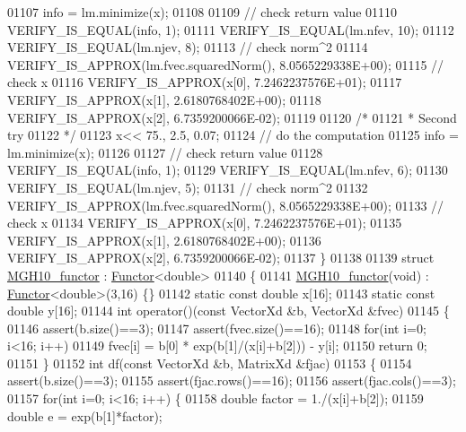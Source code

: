 \begin{DoxyCode}
01107   info = lm.minimize(x);
01108 
01109   \textcolor{comment}{// check return value}
01110   VERIFY\_IS\_EQUAL(info, 1);
01111   VERIFY\_IS\_EQUAL(lm.nfev, 10);
01112   VERIFY\_IS\_EQUAL(lm.njev, 8);
01113   \textcolor{comment}{// check norm^2}
01114   VERIFY\_IS\_APPROX(lm.fvec.squaredNorm(), 8.0565229338E+00);
01115   \textcolor{comment}{// check x}
01116   VERIFY\_IS\_APPROX(x[0], 7.2462237576E+01);
01117   VERIFY\_IS\_APPROX(x[1], 2.6180768402E+00);
01118   VERIFY\_IS\_APPROX(x[2], 6.7359200066E-02);
01119 
01120   \textcolor{comment}{/*}
01121 \textcolor{comment}{   * Second try}
01122 \textcolor{comment}{   */}
01123   x<< 75., 2.5, 0.07;
01124   \textcolor{comment}{// do the computation}
01125   info = lm.minimize(x);
01126 
01127   \textcolor{comment}{// check return value}
01128   VERIFY\_IS\_EQUAL(info, 1);
01129   VERIFY\_IS\_EQUAL(lm.nfev, 6);
01130   VERIFY\_IS\_EQUAL(lm.njev, 5);
01131   \textcolor{comment}{// check norm^2}
01132   VERIFY\_IS\_APPROX(lm.fvec.squaredNorm(), 8.0565229338E+00);
01133   \textcolor{comment}{// check x}
01134   VERIFY\_IS\_APPROX(x[0], 7.2462237576E+01);
01135   VERIFY\_IS\_APPROX(x[1], 2.6180768402E+00);
01136   VERIFY\_IS\_APPROX(x[2], 6.7359200066E-02);
01137 \}
01138 
01139 \textcolor{keyword}{struct }\hyperlink{struct_m_g_h10__functor}{MGH10\_functor} : \hyperlink{struct_functor}{Functor}<double>
01140 \{
01141     \hyperlink{struct_m_g_h10__functor}{MGH10\_functor}(\textcolor{keywordtype}{void}) : \hyperlink{struct_functor}{Functor}<double>(3,16) \{\}
01142     \textcolor{keyword}{static} \textcolor{keyword}{const} \textcolor{keywordtype}{double} x[16];
01143     \textcolor{keyword}{static} \textcolor{keyword}{const} \textcolor{keywordtype}{double} y[16];
01144     \textcolor{keywordtype}{int} operator()(\textcolor{keyword}{const} VectorXd &b, VectorXd &fvec)
01145     \{
01146         assert(b.size()==3);
01147         assert(fvec.size()==16);
01148         \textcolor{keywordflow}{for}(\textcolor{keywordtype}{int} i=0; i<16; i++)
01149             fvec[i] =  b[0] * exp(b[1]/(x[i]+b[2])) - y[i];
01150         \textcolor{keywordflow}{return} 0;
01151     \}
01152     \textcolor{keywordtype}{int} df(\textcolor{keyword}{const} VectorXd &b, MatrixXd &fjac)
01153     \{
01154         assert(b.size()==3);
01155         assert(fjac.rows()==16);
01156         assert(fjac.cols()==3);
01157         \textcolor{keywordflow}{for}(\textcolor{keywordtype}{int} i=0; i<16; i++) \{
01158             \textcolor{keywordtype}{double} factor = 1./(x[i]+b[2]);
01159             \textcolor{keywordtype}{double} e = exp(b[1]*factor);

\end{DoxyCode}
